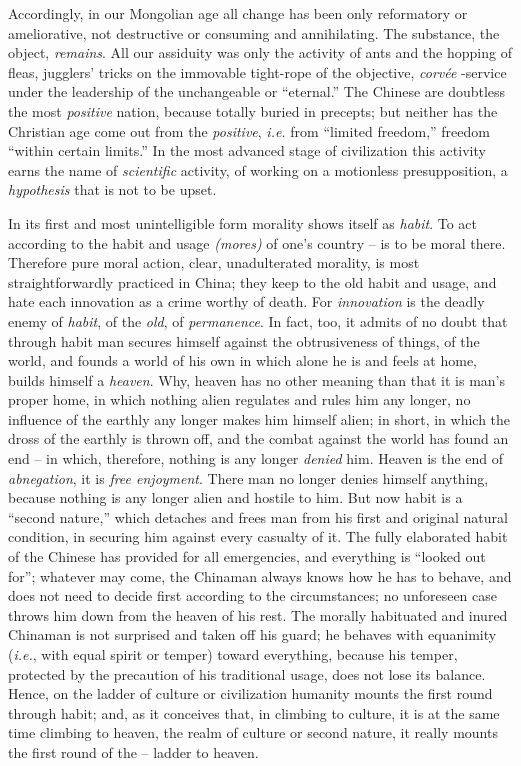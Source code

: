 Accordingly, in our Mongolian age all change has been only reformatory or 
ameliorative, not destructive or consuming and annihilating. The substance, 
the object, \textit{remains}. All our assiduity was only the activity of ants 
and the hopping of fleas, jugglers' tricks on the immovable tight-rope of the 
objective, \textit{corv\'ee} -service under the leadership of the unchangeable 
or ``eternal.'' The Chinese are doubtless the most \textit{positive} nation, 
because totally buried in precepts; but neither has the Christian age come out 
from the \textit{positive}, \textit{i.e.} from ``limited freedom,'' freedom 
``within certain limits.'' In the most advanced stage of civilization this 
activity earns the name of \textit{scientific} activity, of working on a 
motionless presupposition, a \textit{hypothesis} that is not to be upset.

In its first and most unintelligible form morality shows itself as 
\textit{habit}. To act according to the habit and usage \textit{(mores)} of 
one's country -- is to be moral there. Therefore pure moral action, clear, 
unadulterated morality, is most straightforwardly practiced in China; they 
keep to the old habit and usage, and hate each innovation as a crime worthy of 
death. For \textit{innovation} is the deadly enemy of \textit{habit}, of the 
\textit{old}, of \textit{permanence}. In fact, too, it admits of no doubt that 
through habit man secures himself against the obtrusiveness of things, of the 
world, and founds a world of his own in which alone he is and feels at home, 
builds himself a \textit{heaven}. Why, heaven has no other meaning than that 
it is man's proper home, in which nothing alien regulates and rules him any 
longer, no influence of the earthly any longer makes him himself alien; in 
short, in which the dross of the earthly is thrown off, and the combat against 
the world has found an end -- in which, therefore, nothing is any longer 
\textit{denied} him. Heaven is the end of \textit{abnegation}, it is 
\textit{free enjoyment}. There man no longer denies himself anything, because 
nothing is any longer alien and hostile to him. But now habit is a ``second 
nature,'' which detaches and frees man from his first and original natural 
condition, in securing him against every casualty of it. The fully elaborated 
habit of the Chinese has provided for all emergencies, and everything is 
``looked out for''; whatever may come, the Chinaman always knows how he has 
to behave, and does not need to decide first according to the circumstances; 
no unforeseen case throws him down from the heaven of his rest. The morally 
habituated and inured Chinaman is not surprised and taken off his guard; he 
behaves with equanimity (\textit{i.e.}, with equal spirit or temper) toward 
everything, because his temper, protected by the precaution of his traditional 
usage, does not lose its balance. Hence, on the ladder of culture or 
civilization humanity mounts the first round through habit; and, as it 
conceives that, in climbing to culture, it is at the same time climbing to 
heaven, the realm of culture or second nature, it really mounts the first 
round of the -- ladder to heaven.

